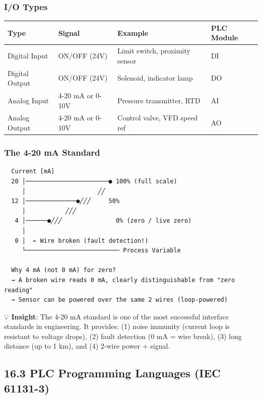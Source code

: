 \documentclass[11pt,a4paper]{book}
\begin{document}
\begin{itemize}
\subsubsection{I/O Types}

\begin{center}
\begin{tabular}{|l|l|l|l|}
\hline
Type & Signal & Example & PLC Module \\
\hline
Digital Input & ON/OFF (24V) & Limit switch, proximity sensor & DI \\
Digital Output & ON/OFF (24V) & Solenoid, indicator lamp & DO \\
Analog Input & 4-20 mA or 0-10V & Pressure transmitter, RTD & AI \\
Analog Output & 4-20 mA or 0-10V & Control valve, VFD speed ref & AO \\
\hline
\end{tabular}
\end{center}

\subsubsection{The 4-20 mA Standard}

\begin{lstlisting}
  Current [mA]
  20 │───────────────────────● 100% (full scale)
     │                    ╱╱
  12 │──────────────●╱╱╱     50%
     │           ╱╱╱
   4 │──────●╱╱╱               0% (zero / live zero)
     │
   0 │  ← Wire broken (fault detection!)
     └────────────────────────── Process Variable
     
  Why 4 mA (not 0 mA) for zero?
  → A broken wire reads 0 mA, clearly distinguishable from "zero reading"
  → Sensor can be powered over the same 2 wires (loop-powered)
\end{lstlisting}

💡 \textbf{Insight}: The 4-20 mA standard is one of the most successful interface standards in engineering. It provides: (1) noise immunity (current loop is resistant to voltage drops), (2) fault detection (0 mA = wire break), (3) long distance (up to 1 km), and (4) 2-wire power + signal.

\medskip\noindent\hrulefill\medskip

\subsection{16.3 PLC Programming Languages (IEC 61131-3)}


\end{itemize}
\end{document}

